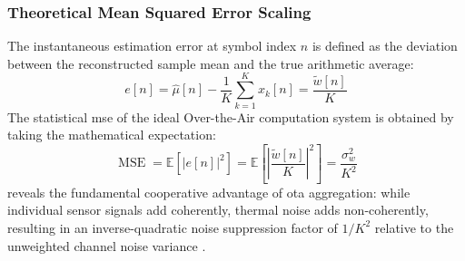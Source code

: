 \documentclass[Markos_Delaportas_1316.tex]{subfiles}
\begin{document}
\subsubsection{Theoretical Mean Squared Error Scaling}
\label{subsubsec:theoretical_mse_scaling}
The instantaneous estimation error at symbol index $n$ is defined as
the deviation between the reconstructed sample mean
and the true arithmetic average:
\begin{equation}
    e[n] = \hat{\mu}[n] - \frac{1}{K} \sum_{k=1}^K x_k[n] =
    \frac{\tilde{w}[n]}{K}
    \label{eq:estimation_error_definition}
\end{equation}
The statistical \gls{mse} of the ideal Over-the-Air computation
system is obtained by taking the mathematical expectation:
\begin{equation}
    \operatorname{MSE} = \mathbb{E}\left[ |e[n]|^2 \right] =
    \mathbb{E}\left[ \left|\frac{\tilde{w}[n]}{K}\right|^2 \right] =
    \frac{\sigma_w^2}{K^2}
    \label{eq:ideal_mse_scaling}
\end{equation}
 reveals the fundamental cooperative
advantage of \gls{ota} aggregation: while individual sensor
signals add coherently, thermal noise adds non-coherently, resulting
in an inverse-quadratic noise suppression factor of $1/K^2$
relative to the unweighted channel noise variance
\cite{sahin_survey_2023, cao_optimized_2022}.
\end{document}
